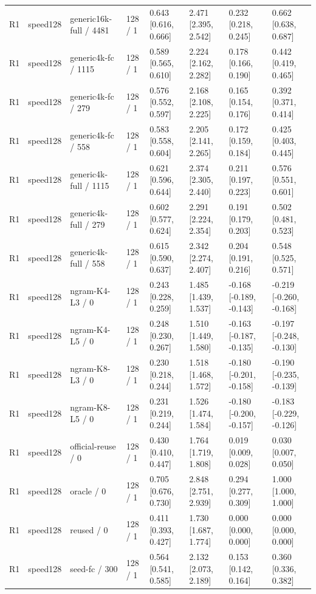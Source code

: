 \begin{tabular}{llllllll}
R1 & speed128 & generic16k-full / 4481 & 128 / 1 & 0.643 [0.616, 0.666] & 2.471 [2.395, 2.542] & 0.232 [0.218, 0.245] & 0.662 [0.638, 0.687] \\
R1 & speed128 & generic4k-fc / 1115 & 128 / 1 & 0.589 [0.565, 0.610] & 2.224 [2.162, 2.282] & 0.178 [0.166, 0.190] & 0.442 [0.419, 0.465] \\
R1 & speed128 & generic4k-fc / 279 & 128 / 1 & 0.576 [0.552, 0.597] & 2.168 [2.108, 2.225] & 0.165 [0.154, 0.176] & 0.392 [0.371, 0.414] \\
R1 & speed128 & generic4k-fc / 558 & 128 / 1 & 0.583 [0.558, 0.604] & 2.205 [2.141, 2.265] & 0.172 [0.159, 0.184] & 0.425 [0.403, 0.445] \\
R1 & speed128 & generic4k-full / 1115 & 128 / 1 & 0.621 [0.596, 0.644] & 2.374 [2.305, 2.440] & 0.211 [0.197, 0.223] & 0.576 [0.551, 0.601] \\
R1 & speed128 & generic4k-full / 279 & 128 / 1 & 0.602 [0.577, 0.624] & 2.291 [2.224, 2.354] & 0.191 [0.179, 0.203] & 0.502 [0.481, 0.523] \\
R1 & speed128 & generic4k-full / 558 & 128 / 1 & 0.615 [0.590, 0.637] & 2.342 [2.274, 2.407] & 0.204 [0.191, 0.216] & 0.548 [0.525, 0.571] \\
R1 & speed128 & ngram-K4-L3 / 0 & 128 / 1 & 0.243 [0.228, 0.259] & 1.485 [1.439, 1.537] & -0.168 [-0.189, -0.143] & -0.219 [-0.260, -0.168] \\
R1 & speed128 & ngram-K4-L5 / 0 & 128 / 1 & 0.248 [0.230, 0.267] & 1.510 [1.449, 1.580] & -0.163 [-0.187, -0.135] & -0.197 [-0.248, -0.130] \\
R1 & speed128 & ngram-K8-L3 / 0 & 128 / 1 & 0.230 [0.218, 0.244] & 1.518 [1.468, 1.572] & -0.180 [-0.201, -0.158] & -0.190 [-0.235, -0.139] \\
R1 & speed128 & ngram-K8-L5 / 0 & 128 / 1 & 0.231 [0.219, 0.244] & 1.526 [1.474, 1.584] & -0.180 [-0.200, -0.157] & -0.183 [-0.229, -0.126] \\
R1 & speed128 & official-reuse / 0 & 128 / 1 & 0.430 [0.410, 0.447] & 1.764 [1.719, 1.808] & 0.019 [0.009, 0.028] & 0.030 [0.007, 0.050] \\
R1 & speed128 & oracle / 0 & 128 / 1 & 0.705 [0.676, 0.730] & 2.848 [2.751, 2.939] & 0.294 [0.277, 0.309] & 1.000 [1.000, 1.000] \\
R1 & speed128 & reused / 0 & 128 / 1 & 0.411 [0.393, 0.427] & 1.730 [1.687, 1.774] & 0.000 [0.000, 0.000] & 0.000 [0.000, 0.000] \\
R1 & speed128 & seed-fc / 300 & 128 / 1 & 0.564 [0.541, 0.585] & 2.132 [2.073, 2.189] & 0.153 [0.142, 0.164] & 0.360 [0.336, 0.382] \\

\end{tabular}
